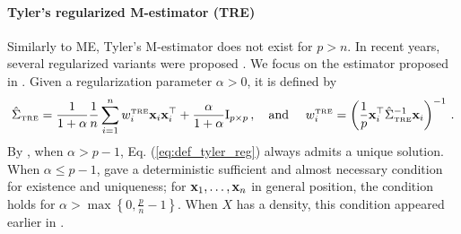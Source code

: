\documentclass[times,sort&compress,3p]{elsarticle}
\begin{document}



  \paragraph{Tyler's regularized M-estimator (TRE)} Similarly to 
  ME, 
  Tyler's M-estimator 
  does not exist for \(p>n.\) In recent years, several regularized variants were proposed \cite{abramovich,chen,pascal,sun2014,ollila2014regularized}. 
  We focus on the estimator proposed in \cite{pascal}.
Given a regularization parameter $\alpha>0$, it is defined by
  \begin{equation}
 \label{eq:def_tyler_reg}
 \hat{\Sigma}_{\mbox{\tiny{TRE}}} = \frac{1}{1+\alpha} \frac{1}{n} \sum_{i=1}^{n} w^{\mbox{\tiny{TRE}}}_i {\bf x}_i {\bf x}_i^{\top} + \frac{\alpha}{1+\alpha} \mathrm{I}_{p \times p} \,,
 \quad
 \textrm{and }
 \quad
 w^{\mbox{\tiny{TRE}}}_i = \left(\frac1p {\bf x}_i^{\top} \hat{\Sigma}_{\mbox{\tiny{TRE}}}^{-1} {\bf x}_i\right)^{-1}\,.
 \end{equation}
By
\cite[Theorem 2]{ollila2014regularized}, when $\alpha>p-1$, 
Eq. (\ref{eq:def_tyler_reg})
always admits a unique solution. When $\alpha\le p-1$, \cite[Theorem 3]{ollila2014regularized}
gave a deterministic sufficient and {almost} necessary condition for existence and uniqueness; for  ${\bf x}_1,\ldots,{\bf x}_n$ in {general position}, the condition holds for $\alpha > \max\left\{ 0,\frac{p}{n}-1 \right\}$. When $X$ has a density, this condition appeared earlier in \cite{pascal}.
\end{document}
